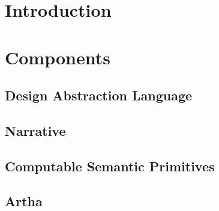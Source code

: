 \documentclass{article}
\begin{document}
\newpage
\section{Introduction}


\section{Components}


\newpage
\subsection{Design Abstraction Language}


\newpage
\subsection{Narrative}


\newpage
\subsection{Computable Semantic Primitives}


\newpage
\subsection{Artha}

\end{document}
